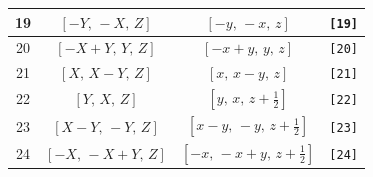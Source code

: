 \documentclass[fleqn,8pt]{jsarticle}
\begin{document}
\begin{longtable}{cccc}
19 & $\left[ - Y,\, - X,\, Z \right]$ & $\left[ - y,\, - x,\, z \right]$ & {\tt [19]} \\ \hline
20 & $\left[ - X + Y,\, Y,\, Z \right]$ & $\left[ - x + y,\, y,\, z \right]$ & {\tt [20]} \\ \hline
21 & $\left[ X,\, X - Y,\, Z \right]$ & $\left[ x,\, x - y,\, z \right]$ & {\tt [21]} \\ \hline
22 & $\left[ Y,\, X,\, Z \right]$ & $\left[ y,\, x,\, z + \frac{1}{2} \right]$ & {\tt [22]} \\ \hline
23 & $\left[ X - Y,\, - Y,\, Z \right]$ & $\left[ x - y,\, - y,\, z + \frac{1}{2} \right]$ & {\tt [23]} \\ \hline
24 & $\left[ - X,\, - X + Y,\, Z \right]$ & $\left[ - x,\, - x + y,\, z + \frac{1}{2} \right]$ & {\tt [24]} \\
\end{longtable}
\end{document}

